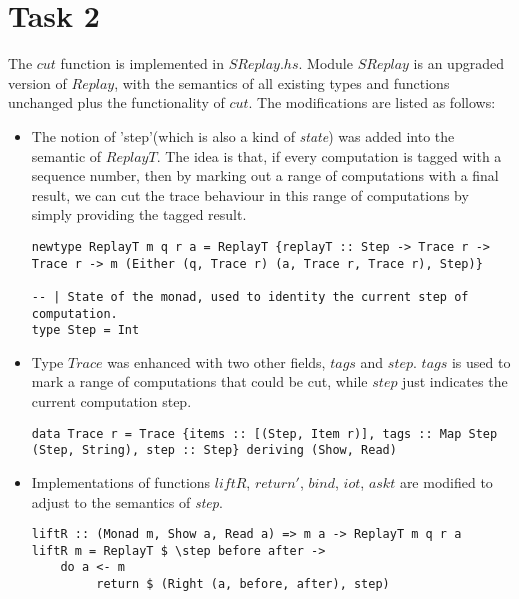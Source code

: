 \documentclass[10pt]{article}
\begin{document}
\section*{Task 2}
The $cut$ function is implemented in $SReplay.hs$. Module $SReplay$ is an upgraded version of $Replay$, with the semantics of all existing types and functions unchanged plus the functionality of $cut$. The modifications are listed as follows:
\begin{itemize}
\item The notion of 'step'(which is also a kind of \textit{state}) was added into the semantic of $ReplayT$. The idea is that, if every computation is tagged with a sequence number, then by marking out a range of computations with a final result, we can cut the trace behaviour in this range of computations by simply providing the tagged result. 
\begin{lstlisting}
newtype ReplayT m q r a = ReplayT {replayT :: Step -> Trace r -> Trace r -> m (Either (q, Trace r) (a, Trace r, Trace r), Step)}

-- | State of the monad, used to identity the current step of computation.                                                                                                                    
type Step = Int  
\end{lstlisting}
\item Type $Trace$ was enhanced with two other fields, $tags$ and $step$. $tags$ is used to mark a range of computations that could be cut, while $step$ just indicates the current computation step.
\begin{lstlisting}
data Trace r = Trace {items :: [(Step, Item r)], tags :: Map Step (Step, String), step :: Step} deriving (Show, Read) 
\end{lstlisting}

\item Implementations of functions $liftR$, $return'$, $bind$, $iot$, $askt$ are modified to adjust to the semantics of \textit{step}.
\begin{lstlisting}
liftR :: (Monad m, Show a, Read a) => m a -> ReplayT m q r a                                                                                                                                  
liftR m = ReplayT $ \step before after -> 
    do a <- m                                                                                                                                           
         return $ (Right (a, before, after), step)
                                             

\end{lstlisting}
\end{itemize}
\end{document}
